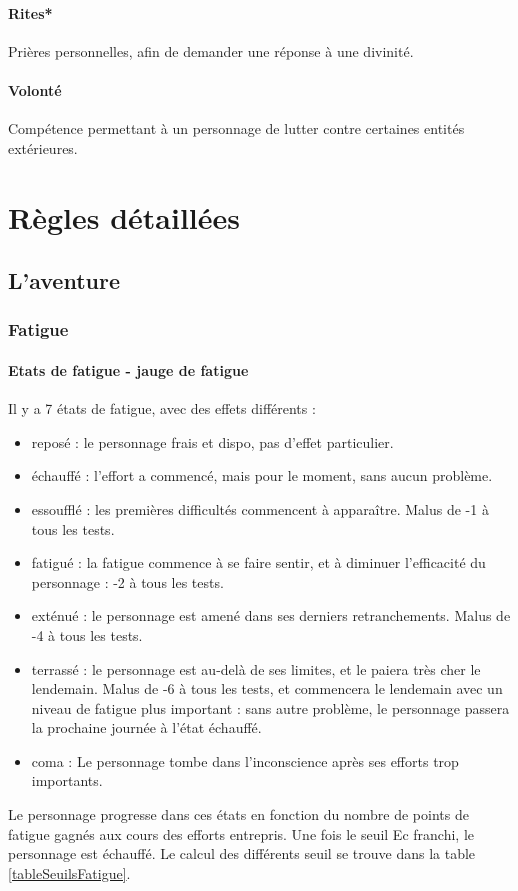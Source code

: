 \documentclass[10pt,a4paper,twocolumn]{book}
\begin{document}
\subsubsection{Rites*}
Prières personnelles, afin de demander une réponse à une divinité.
\subsubsection{Volonté}
Compétence permettant à un personnage de lutter contre certaines entités extérieures.
\chapter{Règles détaillées}

\section{L'aventure}
\subsection{Fatigue}
\subsubsection{Etats de fatigue - jauge de fatigue}
Il y  a 7 états de fatigue, avec des effets différents :

\begin{itemize}

\item{reposé} : le personnage frais et dispo, pas d’effet particulier.
\item{échauffé} : l’effort a commencé, mais pour le moment, sans aucun problème.
\item{essoufflé} : les premières difficultés commencent à apparaître. Malus de -1 à tous les tests.
\item{fatigué} : la fatigue commence à se faire sentir, et à diminuer l’efficacité du personnage : -2 à tous les tests.
\item{exténué} : le personnage est amené dans ses derniers retranchements. Malus de -4 à tous les tests.
\item{terrassé} : le personnage est au-delà de ses limites, et le paiera très cher le lendemain. Malus de -6 à tous les tests, et commencera le lendemain avec un niveau de fatigue plus important : sans autre problème, le personnage passera la prochaine journée à l’état échauffé.
\item{coma} : Le personnage tombe dans l’inconscience après ses efforts trop importants.
\end{itemize}
Le personnage progresse dans ces états en fonction du nombre de points de fatigue gagnés aux cours des efforts entrepris.
Une fois le seuil Ec franchi, le personnage est échauffé. 
Le calcul des différents seuil se trouve dans la table \ref{tableSeuilsFatigue}.
\end{document}
